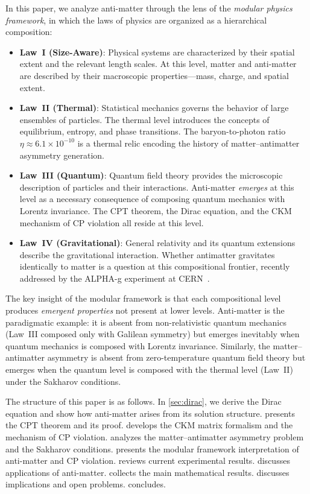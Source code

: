 \documentclass[12pt]{article}
\theoremstyle{definition}
\theoremstyle{remark}
\begin{document}
In this paper, we analyze anti-matter through the lens of the \emph{modular physics
framework}, in which the laws of physics are organized as a hierarchical composition:

\begin{itemize}
    \item \textbf{Law~I (Size-Aware)}: Physical systems are characterized by their
    spatial extent and the relevant length scales. At this level, matter and anti-matter
    are described by their macroscopic properties---mass, charge, and spatial extent.

    \item \textbf{Law~II (Thermal)}: Statistical mechanics governs the behavior of
    large ensembles of particles. The thermal level introduces the concepts of
    equilibrium, entropy, and phase transitions. The baryon-to-photon ratio
    $\eta \approx 6.1 \times 10^{-10}$ is a thermal relic encoding the history of
    matter--antimatter asymmetry generation.

    \item \textbf{Law~III (Quantum)}: Quantum field theory provides the microscopic
    description of particles and their interactions. Anti-matter \emph{emerges} at
    this level as a necessary consequence of composing quantum mechanics with
    Lorentz invariance. The CPT theorem, the Dirac equation, and the CKM mechanism
    of CP violation all reside at this level.

    \item \textbf{Law~IV (Gravitational)}: General relativity and its quantum
    extensions describe the gravitational interaction. Whether antimatter gravitates
    identically to matter is a question at this compositional frontier, recently
    addressed by the ALPHA-g experiment at CERN~\cite{ALPHA2023}.
\end{itemize}

The key insight of the modular framework is that each compositional level produces
\emph{emergent properties} not present at lower levels. Anti-matter is the paradigmatic
example: it is absent from non-relativistic quantum mechanics (Law~III composed only
with Galilean symmetry) but emerges inevitably when quantum mechanics is composed with
Lorentz invariance. Similarly, the matter--antimatter asymmetry is absent from
zero-temperature quantum field theory but emerges when the quantum level is composed
with the thermal level (Law~II) under the Sakharov conditions.

The structure of this paper is as follows. In \cref{sec:dirac}, we derive the Dirac
equation and show how anti-matter arises from its solution structure.
 presents the CPT theorem and its proof.
 develops the CKM matrix formalism and the mechanism of CP violation.
 analyzes the matter--antimatter asymmetry problem and the
Sakharov conditions.
 presents the modular framework interpretation of anti-matter and CP violation.
 reviews current experimental results.
 discusses applications of anti-matter.
 collects the main mathematical results.
 discusses implications and open problems.
 concludes.
\end{document}
